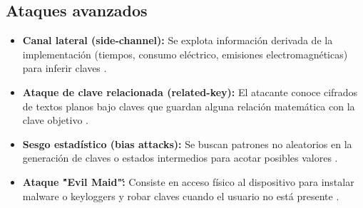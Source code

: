 \subsection{Ataques avanzados}

\begin{itemize}
  \item \textbf{Canal lateral (side-channel):} Se explota información derivada de la implementación (tiempos, consumo eléctrico, emisiones electromagnéticas) para inferir claves \cite{turn1search2}.
  \item \textbf{Ataque de clave relacionada (related-key):} El atacante conoce cifrados de textos planos bajo claves que guardan alguna relación matemática con la clave objetivo \cite{turn1search3}.
  \item \textbf{Sesgo estadístico (bias attacks):} Se buscan patrones no aleatorios en la generación de claves o estados intermedios para acotar posibles valores \cite{turn1search6}.
  \item \textbf{Ataque \'"Evil Maid"\':} Consiste en acceso físico al dispositivo para instalar malware o keyloggers y robar claves cuando el usuario no está presente \cite{turn1search3}.
\end{itemize}